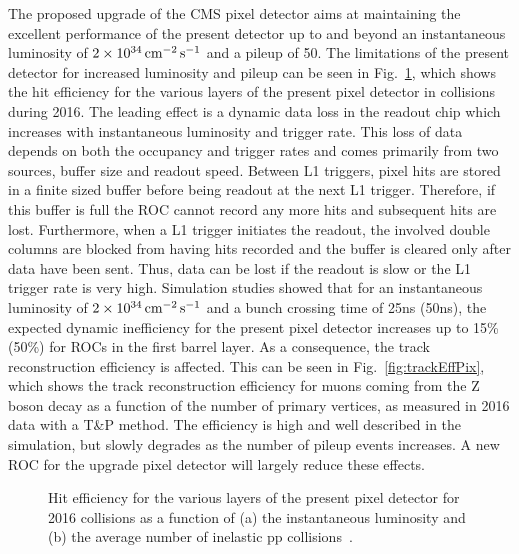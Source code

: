 The proposed upgrade of the CMS pixel detector aims at maintaining the excellent performance of the present detector up to and beyond an instantaneous luminosity of $2\times10^{34}\,\text{cm}^\text{$-$2}\,\text{s}^\text{$-$1}$ and a pileup of 50.
The limitations of the present detector for increased luminosity and pileup can be seen in Fig.~\ref{fig:PixEff}, which shows the hit efficiency for the various layers of the present pixel detector in collisions during 2016.
The leading effect is a dynamic data loss in the readout chip which increases with instantaneous luminosity and trigger rate. This loss of data depends on both the occupancy and trigger rates and comes primarily from two sources, buffer size and readout speed. Between L1 triggers, pixel hits are stored in a finite sized buffer before being readout at the next L1 trigger. Therefore, if this buffer is full the ROC cannot record any more hits and subsequent hits are lost.
Furthermore, when a L1 trigger initiates the readout, the involved double columns are blocked from having hits recorded and the buffer is cleared only after data have been sent.
Thus, data can be lost if the readout is slow or the L1 trigger rate is very high.
Simulation studies showed that for an instantaneous luminosity of $2\times10^{34}\,\text{cm}^\text{$-$2}\,\text{s}^\text{$-$1}$ and a bunch crossing time of 25\unit{ns} (50\unit{ns}),
the expected dynamic inefficiency for the present pixel detector increases up to 15\% (50\%) for ROCs in the first barrel layer.
As a consequence, the track reconstruction efficiency is affected. This can be seen in Fig.~\ref{fig:trackEffPix}, which shows the track reconstruction efficiency for muons coming from the Z boson decay as a function of the number of primary vertices, as measured in 2016 data with a T\&P method. The efficiency is high and well described in the simulation, but slowly degrades as the number of pileup events increases.
A new ROC for the upgrade pixel detector will largely reduce these effects.\\

\begin{figure}[!htb]
 \begin{center}
 \end{center}
 \caption{Hit efficiency for the various layers of the present pixel detector for 2016 collisions as a function of (a) the instantaneous luminosity and (b) the average number of inelastic pp collisions~\cite{PixelOffline}.}
 \label{fig:PixEff}
\end{figure}

